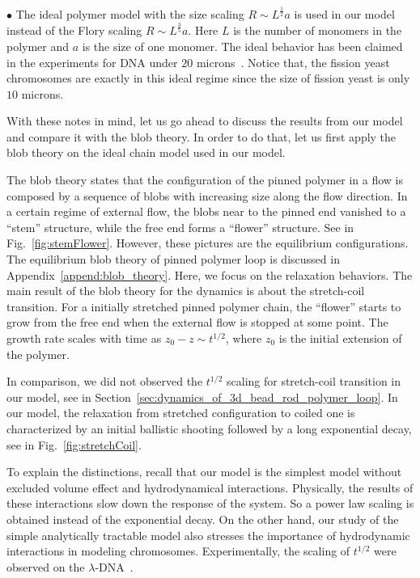 $\bullet$ The ideal polymer model with the size scaling $R\sim L^{\frac{1}{2}} a$ is used in our model instead of the Flory scaling $R \sim L^{\frac{3}{5}} a$. Here $L$ is the number of monomers in the polymer and $a$ is the size of one monomer. The ideal behavior has been claimed in the experiments for DNA under $20$ microns~\cite{Cluzel1996}. Notice that, the fission yeast chromosomes are exactly in this ideal regime since the size of fission yeast is only $10$ microns. 

With these notes in mind, let us go ahead to discuss the results from our model and compare it with the blob theory. In order to do that, let us first apply the blob theory on the ideal chain model used in our model. 

The blob theory states that the configuration of the pinned polymer in a flow is composed by a sequence of blobs with increasing size along the flow direction. In a certain regime of external flow, the blobs near to the pinned end vanished to a ``stem'' structure, while the free end forms a ``flower'' structure. See in Fig.~\ref{fig:stemFlower}. However, these pictures are the equilibrium configurations. The equilibrium blob theory of pinned polymer loop is discussed in Appendix~\ref{append:blob_theory}. Here, we focus on the relaxation behaviors. The main result of the blob theory for the dynamics is about the stretch-coil transition. For a initially stretched pinned polymer chain, the ``flower'' starts to grow from the free end when the external flow is stopped at some point. The growth rate scales with time as $z_0 - z \sim t^{1/2}$, where $z_0$ is the initial extension of the polymer. 

In comparison, we did not observed the $t^{1/2}$ scaling for stretch-coil transition in our model, see in Section~\ref{sec:dynamics_of_3d_bead_rod_polymer_loop}. In our model, the relaxation from stretched configuration to coiled one is characterized by an initial ballistic shooting followed by a long exponential decay, see in Fig.~\ref{fig:stretchCoil}. 

To explain the distinctions, recall that our model is the simplest model without excluded volume effect and hydrodynamical interactions. Physically, the results of these interactions slow down the response of the system. So a power law scaling is obtained instead of the exponential decay. On the other hand, our study of the simple analytically tractable model also stresses the importance of hydrodynamic interactions in modeling chromosomes. Experimentally, the scaling of $t^{1/2}$ were observed on the $\lambda$-DNA~\cite{Perkins1994,Perkins1994a,Manneville1996}.

